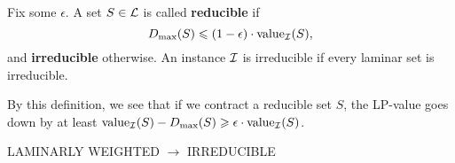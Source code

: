 \documentclass[./main.tex]{subfiles}
\begin{document}
	\begin{definition}
		Fix some $\epsilon$. A set $S\in \mathcal{L}$ is called \textbf{reducible} if
		\[
			D_{\max}(S) \leqslant (1 - \epsilon)\cdot \textup{value}_{\mathcal{I}}(S),
		\]
		and \textbf{irreducible} otherwise.
		An instance $\mathcal{I}$ is irreducible if every laminar set is irreducible.
	\end{definition}

	By this definition, we see that if we contract a reducible set $S$, the LP-value goes down by at least $\textup{value}_{\mathcal{I}}(S) - D_{\max}(S) \geqslant \epsilon\cdot \textup{value}_{\mathcal{I}}(S)$.\\

	\begin{algorithm}[H]\label{alg:1}
		\caption{LAMINARLY WEIGHTED $\rightarrow$ IRREDUCIBLE}
	\end{algorithm}\vspace{2mm}
	
\end{document}
